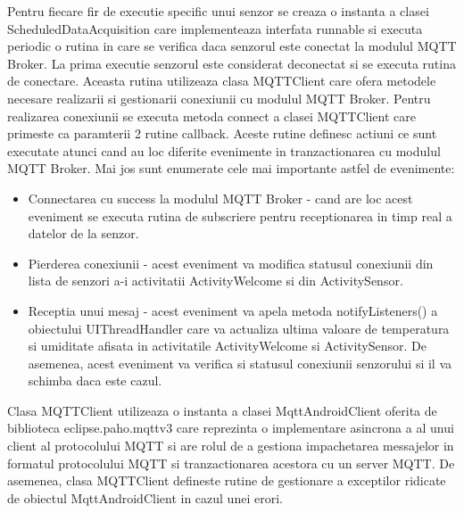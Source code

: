 Pentru fiecare fir de executie specific unui senzor se creaza o instanta a clasei ScheduledDataAcquisition care implementeaza interfata runnable si executa periodic o rutina 
in care se verifica daca senzorul este conectat la modulul MQTT Broker. La prima executie senzorul este considerat deconectat si se executa rutina de conectare. 
Aceasta rutina utilizeaza clasa MQTTClient care ofera metodele necesare realizarii si gestionarii conexiunii cu modulul MQTT Broker. Pentru realizarea conexiunii se 
executa metoda connect a clasei MQTTClient care primeste ca paramterii 2 rutine callback. Aceste rutine definesc actiuni ce sunt executate atunci cand au loc 
diferite evenimente in tranzactionarea cu modulul MQTT Broker. Mai jos sunt enumerate cele mai importante astfel de evenimente:
\begin{itemize}
	\item Connectarea cu success la modulul MQTT Broker - cand are loc acest eveniment se executa rutina de subscriere pentru receptionarea in timp real a datelor de la 
	senzor.
	\item Pierderea conexiunii - acest eveniment va modifica statusul conexiunii din lista de senzori a-i activitatii ActivityWelcome si din ActivitySensor.
	\item Receptia unui mesaj - acest eveniment va apela metoda notifyListeners() a obiectului UIThreadHandler care va actualiza ultima valoare de temperatura si 
	umiditate afisata in activitatile ActivityWelcome si ActivitySensor. De asemenea, acest eveniment va verifica si statusul conexiunii senzorului si il va schimba 
	daca este cazul.
\end{itemize}

Clasa MQTTClient utilizeaza o instanta a clasei MqttAndroidClient oferita de biblioteca eclipse.paho.mqttv3 care reprezinta o implementare asincrona a 
al unui client al protocolului MQTT si are rolul de a gestiona impachetarea messajelor in formatul protocolului MQTT si tranzactionarea acestora cu un server MQTT. De asemenea, 
clasa MQTTClient defineste rutine de gestionare a exceptilor ridicate de obiectul MqttAndroidClient in cazul unei erori. 

